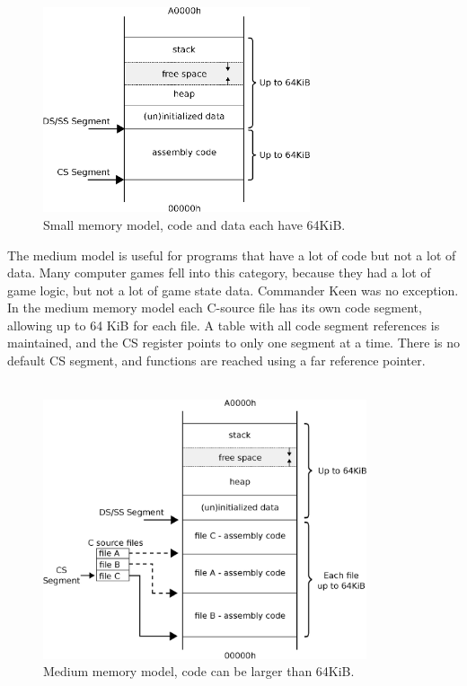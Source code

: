 \documentclass[book.tex]{subfiles}
\begin{document}
\begin{figure}[H]
\centering
\includegraphics[width=0.7\textwidth]{imgs/drawings/memory/small_mm.eps}
\caption{Small memory model, code and data each have 64KiB.}
\label{fig:mm_small}
\end{figure}
\par

The medium model is useful for programs that have a lot of code but not a lot of data. Many computer games fell into this category, because they had a lot of game logic, but not a lot of game state data. Commander Keen was no exception. In the medium memory model each C-source file has its own code segment, allowing up to 64 KiB for each file. A table with all code segment references is maintained, and the CS register points to only one segment at a time. There is no default CS segment, and functions are reached using a far reference pointer. \\

\\

\begin{figure}[H]
\centering
\includegraphics[width=0.85\textwidth]{imgs/drawings/memory/medium_mm.eps}
\caption{Medium memory model, code can be larger than 64KiB.}
\label{fig:mm_medium}
\end{figure}
\par
\end{document}
